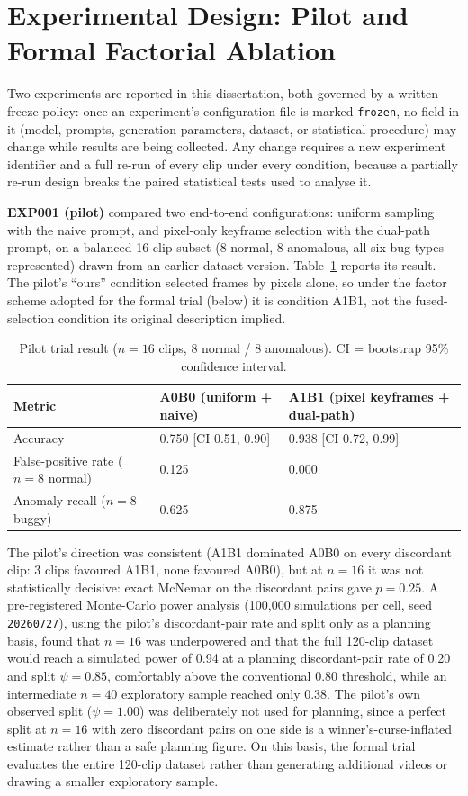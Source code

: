 \section{Experimental Design: Pilot and Formal Factorial Ablation}
\label{sec:exp_design}
Two experiments are reported in this dissertation, both governed by a written freeze policy: once an experiment's configuration file is marked \texttt{frozen}, no field in it (model, prompts, generation parameters, dataset, or statistical procedure) may change while results are being collected. Any change requires a new experiment identifier and a full re-run of every clip under every condition, because a partially re-run design breaks the paired statistical tests used to analyse it.

\textbf{EXP001 (pilot)} compared two end-to-end configurations: uniform sampling with the naive prompt, and pixel-only keyframe selection with the dual-path prompt, on a balanced 16-clip subset (8 normal, 8 anomalous, all six bug types represented) drawn from an earlier dataset version. Table~\ref{tab:pilot-results} reports its result. The pilot's ``ours'' condition selected frames by pixels alone, so under the factor scheme adopted for the formal trial (below) it is condition A1B1, not the fused-selection condition its original description implied.

\begin{table}[htbp]
\centering
\caption[Pilot trial result, $n=16$]{Pilot trial result ($n=16$ clips, 8 normal / 8 anomalous). CI = bootstrap 95\% confidence interval.}
\label{tab:pilot-results}
\begin{tabular}{@{}lll@{}}
\toprule
Metric & A0B0 (uniform + naive) & A1B1 (pixel keyframes + dual-path) \\
\midrule
Accuracy & 0.750 [CI 0.51, 0.90] & 0.938 [CI 0.72, 0.99] \\
False-positive rate ($n=8$ normal) & 0.125 & 0.000 \\
Anomaly recall ($n=8$ buggy) & 0.625 & 0.875 \\
\bottomrule
\end{tabular}
\end{table}

The pilot's direction was consistent (A1B1 dominated A0B0 on every discordant clip: 3 clips favoured A1B1, none favoured A0B0), but at $n=16$ it was not statistically decisive: exact McNemar on the discordant pairs gave $p=0.25$. A pre-registered Monte-Carlo power analysis (100{,}000 simulations per cell, seed \texttt{20260727}), using the pilot's discordant-pair rate and split only as a planning basis, found that $n=16$ was underpowered and that the full 120-clip dataset would reach a simulated power of \num{0.94} at a planning discordant-pair rate of \num{0.20} and split $\psi=0.85$, comfortably above the conventional \num{0.80} threshold, while an intermediate $n=40$ exploratory sample reached only \num{0.38}. The pilot's own observed split ($\psi=1.00$) was deliberately not used for planning, since a perfect split at $n=16$ with zero discordant pairs on one side is a winner's-curse-inflated estimate rather than a safe planning figure. On this basis, the formal trial evaluates the entire 120-clip dataset rather than generating additional videos or drawing a smaller exploratory sample.

